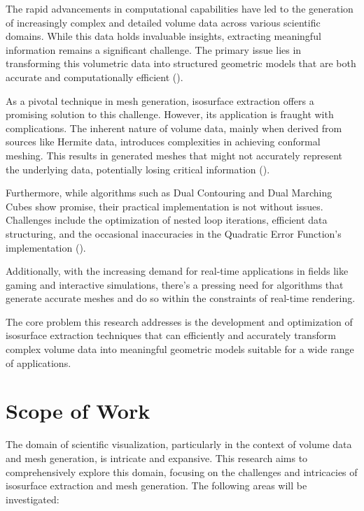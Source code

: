 The rapid advancements in computational capabilities have led to the generation of increasingly complex and detailed volume data across various scientific domains. While this data holds invaluable insights, extracting meaningful information remains a significant challenge. The primary issue lies in transforming this volumetric data into structured geometric models that are both accurate and computationally efficient (\cite{Lorensen_1987}).

As a pivotal technique in mesh generation, isosurface extraction offers a promising solution to this challenge. However, its application is fraught with complications. The inherent nature of volume data, mainly when derived from sources like Hermite data, introduces complexities in achieving conformal meshing. This results in generated meshes that might not accurately represent the underlying data, potentially losing critical information (\cite{Wünsche_1997}).

Furthermore, while algorithms such as Dual Contouring and Dual Marching Cubes show promise, their practical implementation is not without issues. Challenges include the optimization of nested loop iterations, efficient data structuring, and the occasional inaccuracies in the Quadratic Error Function's implementation (\cite{Krüger_2003}).

Additionally, with the increasing demand for real-time applications in fields like gaming and interactive simulations, there's a pressing need for algorithms that generate accurate meshes and do so within the constraints of real-time rendering.

The core problem this research addresses is the development and optimization of isosurface extraction techniques that can efficiently and accurately transform complex volume data into meaningful geometric models suitable for a wide range of applications.

\section{Scope of Work}

The domain of scientific visualization, particularly in the context of volume data and mesh generation, is intricate and expansive. This research aims to comprehensively explore this domain, focusing on the challenges and intricacies of isosurface extraction and mesh generation. The following areas will be investigated:


